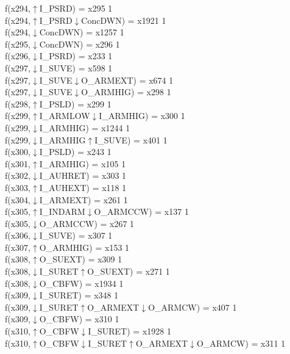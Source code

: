 f(x294,$\uparrow$I\_PSRD) = x295 {1} \\
f(x294,$\uparrow$I\_PSRD$\downarrow$ConcDWN) = x1921 {1} \\
f(x294,$\downarrow$ConcDWN) = x1257 {1} \\
f(x295,$\downarrow$ConcDWN) = x296 {1} \\
f(x296,$\downarrow$I\_PSRD) = x233 {1} \\
f(x297,$\downarrow$I\_SUVE) = x598 {1} \\
f(x297,$\downarrow$I\_SUVE$\downarrow$O\_ARMEXT) = x674 {1} \\
f(x297,$\downarrow$I\_SUVE$\downarrow$O\_ARMHIG) = x298 {1} \\
f(x298,$\uparrow$I\_PSLD) = x299 {1} \\
f(x299,$\uparrow$I\_ARMLOW$\downarrow$I\_ARMHIG) = x300 {1} \\
f(x299,$\downarrow$I\_ARMHIG) = x1244 {1} \\
f(x299,$\downarrow$I\_ARMHIG$\uparrow$I\_SUVE) = x401 {1} \\
f(x300,$\downarrow$I\_PSLD) = x243 {1} \\
f(x301,$\uparrow$I\_ARMHIG) = x105 {1} \\
f(x302,$\downarrow$I\_AUHRET) = x303 {1} \\
f(x303,$\uparrow$I\_AUHEXT) = x118 {1} \\
f(x304,$\downarrow$I\_ARMEXT) = x261 {1} \\
f(x305,$\uparrow$I\_INDARM$\downarrow$O\_ARMCCW) = x137 {1} \\
f(x305,$\downarrow$O\_ARMCCW) = x267 {1} \\
f(x306,$\downarrow$I\_SUVE) = x307 {1} \\
f(x307,$\uparrow$O\_ARMHIG) = x153 {1} \\
f(x308,$\uparrow$O\_SUEXT) = x309 {1} \\
f(x308,$\downarrow$I\_SURET$\uparrow$O\_SUEXT) = x271 {1} \\
f(x308,$\downarrow$O\_CBFW) = x1934 {1} \\
f(x309,$\downarrow$I\_SURET) = x348 {1} \\
f(x309,$\downarrow$I\_SURET$\uparrow$O\_ARMEXT$\downarrow$O\_ARMCW) = x407 {1} \\
f(x309,$\downarrow$O\_CBFW) = x310 {1} \\
f(x310,$\uparrow$O\_CBFW$\downarrow$I\_SURET) = x1928 {1} \\
f(x310,$\uparrow$O\_CBFW$\downarrow$I\_SURET$\uparrow$O\_ARMEXT$\downarrow$O\_ARMCW) = x311 {1} \\

